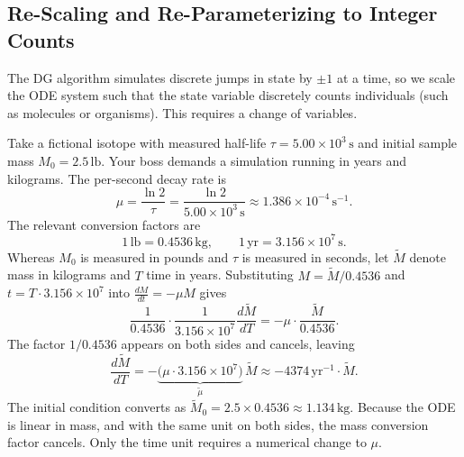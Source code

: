\subsection{Re-Scaling and Re-Parameterizing to Integer Counts}\label{subsec:alg_rescaling}


The DG algorithm simulates discrete jumps in state by $\pm 1$ at a time, so we scale the ODE system such that the state variable discretely counts individuals (such as molecules or organisms). This requires a change of variables.


\begin{example}\label{ex:radioactive_decay_units}
Take a fictional isotope with measured half-life $\tau = 5.00 \times 10^{3}\,\mathrm{s}$ and initial sample mass $M_0 = 2.5\,\mathrm{lb}$. Your boss demands a simulation running in years and kilograms. The per-second decay rate is
\[
  \mu = \frac{\ln 2}{\tau}
      = \frac{\ln 2}{5.00 \times 10^{3}\,\mathrm{s}}
      \approx 1.386 \times 10^{-4}\,\mathrm{s}^{-1}.
\]
The relevant conversion factors are
\[
  1\,\mathrm{lb} = 0.4536\,\mathrm{kg},
  \qquad
  1\,\mathrm{yr} = 3.156 \times 10^{7}\,\mathrm{s}.
\]
Whereas $M_0$ is measured in pounds and $\tau$ is measured in seconds, let $\widetilde{M}$ denote mass in kilograms and $T$ time in years.
Substituting $M = \widetilde{M}/0.4536$ and $t = T \cdot 3.156 \times 10^{7}$
into $\frac{dM}{dt} = -\mu M$ gives
\[
  \frac{1}{0.4536} \cdot \frac{1}{3.156 \times 10^{7}}
  \frac{d\widetilde{M}}{dT}
  =
  -\mu \cdot \frac{\widetilde{M}}{0.4536}.
\]
The factor $1/0.4536$ appears on both sides and cancels, leaving
\[
  \frac{d\widetilde{M}}{dT}
  = -\underbrace{\bigl(\mu \cdot 3.156 \times 10^{7}\bigr)}_{\displaystyle\widetilde{\mu}}\,
  \widetilde{M}
  \approx -4374\,\mathrm{yr}^{-1} \cdot \widetilde{M}.
\]
The initial condition converts as
$\widetilde{M}_0 = 2.5 \times 0.4536 \approx 1.134\,\mathrm{kg}$.
Because the ODE is linear in mass, and with the same unit on both sides,
the mass conversion factor cancels. Only the time unit requires a numerical
change to $\mu$.
\end{example}

